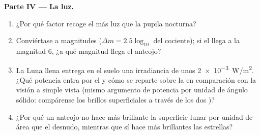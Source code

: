 \begin{problem}
\medskip
\noindent\textbf{Parte IV --- La luz.}
\begin{enumerate}[resume]
  \item ¿Por qué factor recoge el  más luz que la pupila
        nocturna?
  \item Conviértase a magnitudes ($\Delta m = 2.5\log_{10}$ del cociente);
        si el  llega a la magnitud $6$, ¿a qué magnitud llega el
        anteojo?
  \item La Luna llena entrega en el suelo una irradiancia de unos
        \qty{2e-3}{W/m^2}. ¿Qué potencia entra por el  y cómo se
        reparte sobre la  en comparación con la visión a simple
        vista (mismo argumento de potencia por unidad de ángulo sólido:
        compárense los brillos superficiales a través de los dos )?
  \item ¿Por qué un anteojo no hace más brillante la superficie lunar por
        unidad de área que el  desnudo, mientras que sí hace más
        brillantes las estrellas?
\end{enumerate}


\end{problem}
